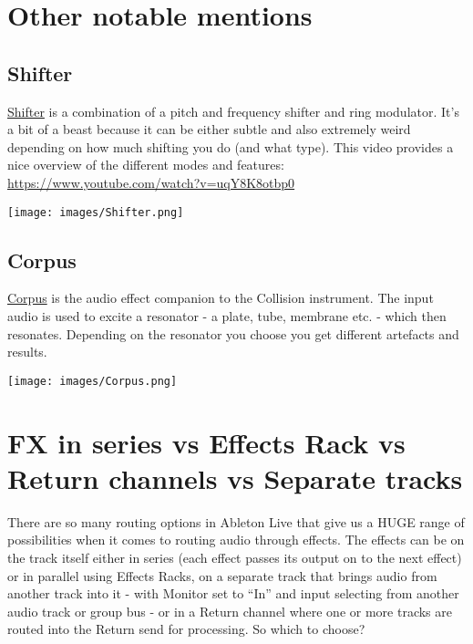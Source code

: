 \documentclass[
  12pt,
  letterpaper,
  oneside,
  open=any]{scrbook}
\begin{document}
\section{Other notable mentions}\label{other-notable-mentions}

\subsection{Shifter}\label{shifter}

\href{https://www.ableton.com/en/live-manual/11/live-audio-effect-reference/\#shifter}{Shifter}
is a combination of a pitch and frequency shifter and ring modulator.
It's a bit of a beast because it can be either subtle and also extremely
weird depending on how much shifting you do (and what type). This video
provides a nice overview of the different modes and features:
\url{https://www.youtube.com/watch?v=uqY8K8otbp0}

\texttt{[image: images/Shifter.png]}

\subsection{Corpus}\label{corpus}

\href{https://www.ableton.com/en/live-manual/11/live-audio-effect-reference/\#corpus}{Corpus}
is the audio effect companion to the Collision instrument. The input
audio is used to excite a resonator - a plate, tube, membrane etc. -
which then resonates. Depending on the resonator you choose you get
different artefacts and results.

\texttt{[image: images/Corpus.png]}

\section{FX in series vs Effects Rack vs Return channels vs Separate
tracks}\label{fx-in-series-vs-effects-rack-vs-return-channels-vs-separate-tracks}

There are so many routing options in Ableton Live that give us a HUGE
range of possibilities when it comes to routing audio through effects.
The effects can be on the track itself either in series (each effect
passes its output on to the next effect) or in parallel using Effects
Racks, on a separate track that brings audio from another track into it
- with Monitor set to ``In'' and input selecting from another audio
track or group bus - or in a Return channel where one or more tracks are
routed into the Return send for processing. So which to choose?
\end{document}
